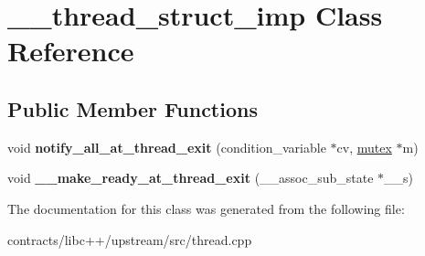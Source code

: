 \hypertarget{class____thread__struct__imp}{}\section{\+\_\+\+\_\+thread\+\_\+struct\+\_\+imp Class Reference}
\label{class____thread__struct__imp}
\subsection*{Public Member Functions}
\begin{DoxyCompactItemize}
\item 
\mbox{\label{class____thread__struct__imp_af41b93eecda6edb87798ed0b5a5cb4b9}} 
void {\bfseries notify\+\_\+all\+\_\+at\+\_\+thread\+\_\+exit} (condition\+\_\+variable $\ast$cv, \mbox{\hyperlink{structmutex}{mutex}} $\ast$m)
\item 
\mbox{\label{class____thread__struct__imp_a3106500cccf972fc891630d379cd2177}} 
void {\bfseries \+\_\+\+\_\+make\+\_\+ready\+\_\+at\+\_\+thread\+\_\+exit} (\+\_\+\+\_\+assoc\+\_\+sub\+\_\+state $\ast$\+\_\+\+\_\+s)
\end{DoxyCompactItemize}


The documentation for this class was generated from the following file\+:\begin{DoxyCompactItemize}
\item 
contracts/libc++/upstream/src/thread.\+cpp\end{DoxyCompactItemize}

